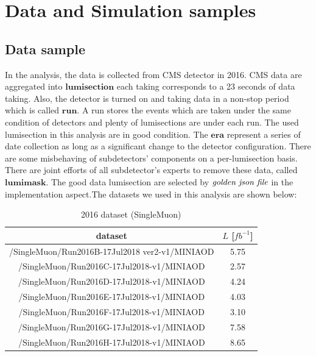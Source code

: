 

\section{Data and Simulation samples}
\label{sec:DataAndMC}

	\subsection{Data sample}
	\label{ssec:DataAndMC_Data}

		In the analysis, the data is collected from CMS detector in 2016. CMS data are aggregated into $\textbf{lumisection}$ each taking corresponds to a 23 seconds of data taking\cite{Borisyak_2017}. Also, the detector is turned on and taking data in a non-stop period which is called $\textbf{run}$. A run stores the events which are taken under the same condition of detectors and plenty of lumisections are under each run. The used lumisection in this analysis are in good condition. The $\textbf{era}$ represent a series of date collection as long as a significant change to the detector configuration. There are some misbehaving of subdetectors' components on a per-lumisection basis. There are joint efforts of all subdetector's experts to remove these data, called $\textbf{lumimask}$. The good data lumisection are selected by $\emph{golden json file}$ in the implementation aspect.The datasets we used in this analysis are shown below:

		\begin{center}
		\setlength{\tabcolsep}{12pt}
		\begin{longtable}{ | c | c | }
		\caption{2016 dataset (SingleMuon)} \\
		\hline
		dataset & $L$ [$fb^{-1}$]\\
		\hline
		/SingleMuon/Run2016B-17Jul2018 ver2-v1/MINIAOD & 5.75 \\
		/SingleMuon/Run2016C-17Jul2018-v1/MINIAOD & 2.57 \\
		/SingleMuon/Run2016D-17Jul2018-v1/MINIAOD & 4.24 \\
		/SingleMuon/Run2016E-17Jul2018-v1/MINIAOD & 4.03 \\
		/SingleMuon/Run2016F-17Jul2018-v1/MINIAOD & 3.10 \\
		/SingleMuon/Run2016G-17Jul2018-v1/MINIAOD & 7.58 \\
		/SingleMuon/Run2016H-17Jul2018-v1/MINIAOD & 8.65 \\
		\hline
		\end{longtable}
		\label{DataAndMC:tb:dataset_mu}
		\end{center}

